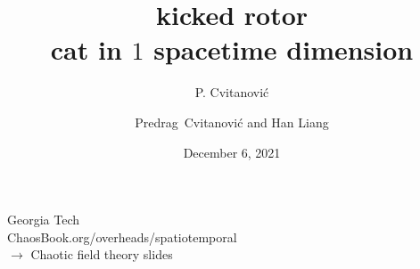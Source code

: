 

                        \newif\ifboyscout\boyscouttrue          %
                        \newif\ifsubmission\submissionfalse     %
                        \newif\ifblog\blogfalse %


\usepackage[font=scriptsize, labelfont=bf]{caption}
\usepackage[
    backend=biber,  %
    sorting=nyt,
    style=numeric, %
    natbib=true,
    style=phys, %
    biblabel= brackets, %
    articletitle=false, %
    pageranges = true , %
    sortlocale=en_US,
    firstinits=true,
    url=false, %
    doi=false, %
    eprint=false
]{biblatex}



\renewcommand{\Ssym}[1]{{\ensuremath{m_{#1}}}}    %


\title{
{\huge kicked rotor} %
    \\
{cat in $1$ spacetime dimension}
}
\author{P. Cvitanovi\'c}
\author[Cvitanovi\'c]
{
  \textcolor{green!50!black}{
  {Predrag~Cvitanovi\'c
   and
   Han Liang
  }	%
  }
}
\institute
{               Georgia Tech     \\
                {\scriptsize
 ChaosBook.org/overheads/spatiotemporal \\
 $\to$ Chaotic field theory slides    }
 }
\date{December 6, 2021}


